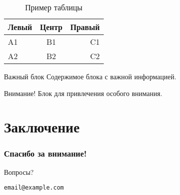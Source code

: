 \documentclass[aspectratio=169, t]{beamer}  %
\begin{document}
\begin{frame}
    \frametitle{\insertsection}
    
    \begin{table}
        \centering
        \begin{tabular}{|l|c|r|}
            \hline
            \textbf{Левый} & \textbf{Центр} & \textbf{Правый} \\
            \hline
            A1 & B1 & C1 \\
            A2 & B2 & C2 \\
            \hline
        \end{tabular}
        \caption{Пример таблицы}
    \end{table}
    
    \begin{block}{Важный блок}
        Содержимое блока с важной информацией.
    \end{block}
    
    \begin{alertblock}{Внимание!}
        Блок для привлечения особого внимания.
    \end{alertblock}
    
\end{frame}

\section*{Заключение} %

\begin{frame}
    \frametitle{Спасибо за внимание!}
    \begin{center}
        \huge{Вопросы?}
        
        \vspace{1cm}
        \normalsize{\texttt{email@example.com}}
    \end{center}
\end{frame}
\end{document}
